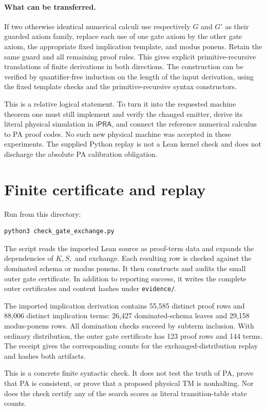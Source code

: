 \documentclass[11pt]{article}
\newcommand{\iPRA}{\mathsf{iPRA}}
\begin{document}
\paragraph{What can be transferred.}
If two otherwise identical numerical calculi use respectively $G$ and
$G'$ as their guarded axiom family, replace each use of one gate axiom
by the other gate axiom, the appropriate fixed implication template, and
modus ponens. Retain the same guard and all remaining proof rules.
This gives explicit primitive-recursive translations of finite derivations
in both directions. The construction can be verified by quantifier-free
induction on the length of the input derivation, using the fixed template
checks and the primitive-recursive syntax constructors.

This is a relative logical statement. To turn it into the requested
machine theorem one must still implement and verify the changed emitter,
derive its literal physical simulation in $\iPRA$, and connect the
reference numerical calculus to PA proof codes. No such new physical
machine was accepted in these experiments. The supplied Python replay
is not a Lean kernel check and does not discharge the absolute PA
calibration obligation.

\section{Finite certificate and replay}

Run from this directory:
\begin{verbatim}
python3 check_gate_exchange.py
\end{verbatim}
The script reads the imported Lean source as proof-term data and expands
the dependencies of $K,S,$ and exchange. Each resulting row is checked
against the dominated schema or modus ponens. It then constructs and
audits the small outer gate certificate. In addition to reporting success,
it writes the complete outer certificates and content hashes under
\nolinkurl{evidence/}.

The imported implication derivation contains 55,585 distinct proof rows
and 88,006 distinct implication terms: 26,427 dominated-schema leaves
and 29,158 modus-ponens rows. All domination checks succeed by subterm
inclusion. With ordinary distribution, the outer gate certificate has
123 proof rows and 144 terms. The receipt gives the corresponding counts
for the exchanged-distribution replay and hashes both artifacts.

This is a concrete finite syntactic check. It does not test the truth of
PA, prove that PA is consistent, or prove that a proposed physical TM is
nonhalting. Nor does the check certify any of the search scores as literal
transition-table state counts.
\end{document}
